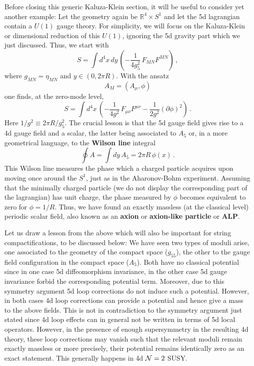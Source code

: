 \documentclass[12pt]{article}
\newcommand{\be}{\begin{equation}}
\newcommand{\ee}{\end{equation}}
\numberwithin{equation}{section}
\begin{document}
Before closing this generic Kaluza-Klein section, it will be useful to consider yet another example: Let the geometry again be $\mathbb{R}^4\times S^1$ and let the 5d lagrangian contain a $U(1)$ gauge theory. For simplicity, we will focus on the Kaluza-Klein or dimensional reduction of this $U(1)$, ignoring the 5d gravity part which we just discussed. Thus, we start with
\be
S=\int d^4x\,dy\,\left(-\frac{1}{4g_5^2}\, F_{MN}F^{MN}\right)\,,
\ee
where $g_{MN}=\eta_{MN}$ and $y\in (0,2\pi R)$. With the ansatz 
\be
A_M=(A_\mu,\phi)
\ee
one finds, at the zero-mode level,
\be
S=\int d^4 x\,\left(-\frac{1}{4g^2}\,F_{\mu\nu}F^{\mu\nu}-\frac{1}{2g^2}(\partial \phi)^2 \right)\,.
\ee
Here $1/g^2\equiv 2\pi R/g_5^2$. The crucial lesson is that the 5d gauge field gives rise to a 4d gauge field and a scalar, the latter being associated to $A_5$ or, in a more geometrical language, to the {\bf Wilson line} integral
\be
\oint A=\int dy\,A_5=2\pi R\,\phi(x)\,.
\ee
This Wilson line measures the phase which a charged particle acquires upon moving once around the $S^1$, just as in the Aharonov-Bohm experiment. Assuming that the minimally charged particle (we do not display the corresponding part of the lagrangian) has unit charge, the phase measured by $\phi$ becomes equivalent to zero for $\phi=1/R$. Thus, we have found an exactly massless (at the classical level) periodic scalar field, also known as an {\bf axion} or {\bf axion-like particle} or {\bf ALP}.

Let us draw a lesson from the above which will also be important for string compactifications, to be discussed below: We have seen two types of moduli arise, one associated to the geometry of the compact space ($g_{55}$), the other to the gauge field configuration in the compact space ($A_5$). Both have no classical potential since in one case 5d diffeomorphism invariance, in the other case 5d gauge invariance forbid the corresponding potential term. Moreover, due to this symmetry argument 5d loop corrections do not induce such a potential. However, in both cases 4d loop corrections can provide a potential and hence give a mass to the above fields. This is not in contradiction to the symmetry argument just stated since 4d loop effects can in general not be written in terms of 5d local operators. However, in the presence of enough supersymmetry in the resulting 4d theory, these loop corrections may vanish such that the relevant moduli remain exactly massless or more precisely, their potential remains identically zero as an exact statement. This generally happens in 4d ${\cal N}=2$ SUSY.
\end{document}
